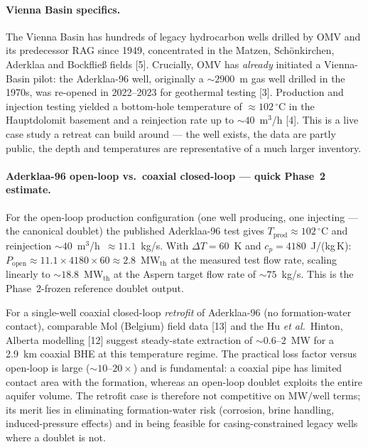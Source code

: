 \documentclass{article}
\begin{document}
\paragraph{Vienna Basin specifics.}
The Vienna Basin has hundreds of legacy hydrocarbon wells drilled by OMV
and its predecessor RAG since 1949, concentrated in the Matzen,
Sch\"onkirchen, Aderklaa and Bockflie{\ss} fields [5].
Crucially, OMV has \emph{already} initiated a Vienna-Basin pilot:
the Aderklaa-96 well, originally a $\sim 2900$~m gas well drilled in
the 1970s, was re-opened in 2022--2023 for geothermal testing
[3]. Production and injection testing yielded a bottom-hole
temperature of $\approx 102\,^\circ$C in the Hauptdolomit basement and a
reinjection rate up to $\sim 40$~m$^3$/h [4]. This is a live
case study a retreat can build around --- the well exists, the data are
partly public, the depth and temperatures are representative of a much
larger inventory.

\paragraph{Aderklaa-96 open-loop vs.\ coaxial closed-loop ---
quick Phase~2 estimate.} For the open-loop production
configuration (one well producing, one injecting --- the canonical
doublet) the published Aderklaa-96 test gives
$T_{\mathrm{prod}}\approx 102\,^\circ$C and reinjection
$\sim 40$~m$^3$/h~$\approx 11.1$~kg/s. With $\Delta T = 60$~K and
$c_p = 4180$~J/(kg\,K):
$P_{\mathrm{open}} \approx 11.1 \times 4180 \times 60 \approx
2.8$~MW$_{\mathrm{th}}$ at the measured test flow rate, scaling
linearly to $\sim 18.8$~MW$_{\mathrm{th}}$ at the Aspern target
flow rate of $\sim 75$~kg/s. This is the Phase~2-frozen reference
doublet output.

For a single-well coaxial closed-loop \emph{retrofit}
of Aderklaa-96 (no formation-water contact), comparable Mol
(Belgium) field data [13] and the Hu \emph{et al.}\ Hinton, Alberta
modelling [12] suggest steady-state extraction of $\sim 0.6$--$2$~MW
for a 2.9~km coaxial BHE at this temperature regime. The
practical loss factor versus open-loop is large
($\sim 10$--$20\times$) and is fundamental: a coaxial pipe has
limited contact area with the formation, whereas an open-loop
doublet exploits the entire aquifer volume. The retrofit case is
therefore not competitive on $\mathrm{MW}/\mathrm{well}$ terms;
its merit lies in eliminating formation-water risk (corrosion,
brine handling, induced-pressure effects) and in being feasible
for casing-constrained legacy wells where a doublet is not.
\end{document}
